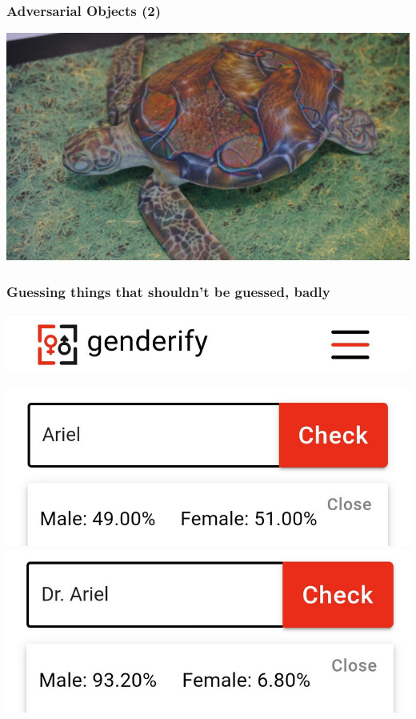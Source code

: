 \documentclass[aspectratio=169,x11names]{beamer}
\begin{document}
\begin{frame}
\frametitle{Adversarial Objects (2)}
\begin{center}
\includegraphics[height=0.7\paperheight,keepaspectratio]{images/rifle_turtle} 
\end{center}
\end{frame}

\begin{frame}
\frametitle{Guessing things that shouldn't be guessed, badly}
\begin{center}
\includegraphics[height=0.175\paperheight,keepaspectratio]{images/genderify_header} 
\bigskip

\includegraphics[height=0.275\paperheight,keepaspectratio]{images/genderify_ariel}
\includegraphics[height=0.275\paperheight,keepaspectratio]{images/genderify_dr_ariel} 
\end{center}
\end{frame}
\end{document}
